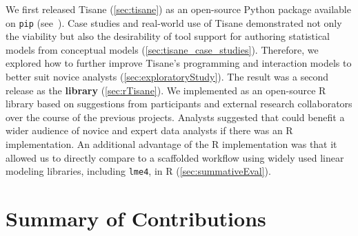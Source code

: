 We first released Tisane (\autoref{sec:tisane}) as an open-source Python package
available on \texttt{pip} (see~\cite{tisaneWebsite}). Case studies and
real-world use of Tisane demonstrated not only the viability but also the
desirability of tool support for authoring statistical models from conceptual
models (\autoref{sec:tisane_case_studies}). Therefore, we explored how to
further improve Tisane's programming and interaction models to better suit
novice analysts (\autoref{sec:exploratoryStudy}). The result was a second
release as the \textbf{\rTisane library} \cite{jun2023rTisane}
(\autoref{sec:rTisane}). We implemented \rTisane as an open-source R library
based on suggestions from participants and external research collaborators over
the course of the previous projects. Analysts suggested that \tisane could
benefit a wider audience of novice and expert data analysts if there was an R
implementation.
An additional advantage of the R implementation was that it allowed us to directly
compare \rTisane to a scaffolded workflow using widely used linear modeling
libraries, including \texttt{lme4}, in R (\autoref{sec:summativeEval}). 














\section{Summary of Contributions}


